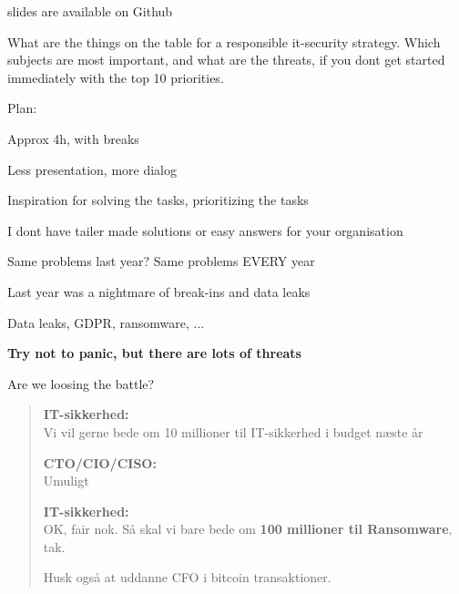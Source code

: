 \documentclass[Screen16to9,17pt]{foils}
\begin{document}


\vskip 1cm
\centerline{\footnotesize slides are available on Github}


What are the things on the table for a responsible it-security strategy. Which subjects are most important, and what are the threats, if you dont get started immediately with the top 10 priorities.


\begin{list2}
\item Plan:
\item Approx 4h, with breaks
\item Less presentation, more dialog
\item Inspiration for solving the tasks, prioritizing the tasks
\item I dont have tailer made solutions or easy answers for your organisation
\end{list2}




\begin{list2}
\item Same problems last year? Same problems EVERY year
\item Last year was a nightmare of break-ins and data leaks
\item Data leaks, GDPR, ransomware, ...
\end{list2}

\vskip 1cm
{\LARGE\bf Try not to panic, but there are lots of threats}

Are we loosing the battle?



\begin{quote}
{\bf IT-sikkerhed:}\\
Vi vil gerne bede om 10 millioner til IT-sikkerhed i budget næste år

{\bf CTO/CIO/CISO:}\\
Umuligt

{\bf IT-sikkerhed:}\\
OK, fair nok. Så skal vi bare bede om {\bf 100 millioner til Ransomware}, tak.

Husk også at uddanne CFO i bitcoin transaktioner.
\end{quote}
\end{document}
